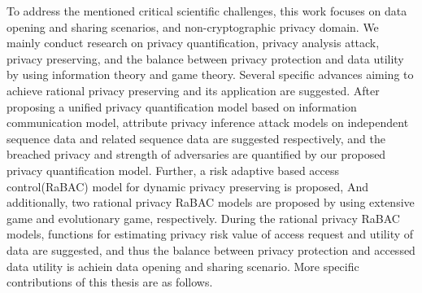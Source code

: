 \documentclass[pdftex,notypeinfo,twoside,openany,UTF8,fntef]{CASthesis}
\theoremstyle{THrm}{
	\newtheorem{question}{Question}[section]
	\newtheorem{property}{性质}[section]
	\newtheorem{assumption}{假设}[section]
	\newtheorem{claim}[lemma]{断言}
	
}
\begin{document}
To address the mentioned critical scientific challenges, this work focuses on data opening and sharing scenarios, and non-cryptographic privacy domain. We mainly conduct research on privacy quantification, privacy analysis attack, privacy preserving, and the balance between privacy protection and data utility by using information theory and game theory. Several specific advances aiming to achieve rational privacy preserving and its application are suggested. After proposing a unified privacy quantification model based on information communication model,  attribute privacy inference attack models on independent sequence data and related sequence data are suggested respectively, and the breached privacy and strength of adversaries are quantified by our proposed  privacy quantification model. Further, a risk adaptive based access control(RaBAC) model for dynamic privacy preserving  is proposed, And additionally, two rational privacy RaBAC models are proposed by using extensive game and evolutionary game, respectively. During the rational privacy RaBAC models, functions for estimating privacy risk value of access request and utility of data are suggested, and thus the balance between privacy protection and accessed data utility is achiein data opening and sharing scenario. More specific contributions of this thesis are as follows.
\end{document}
